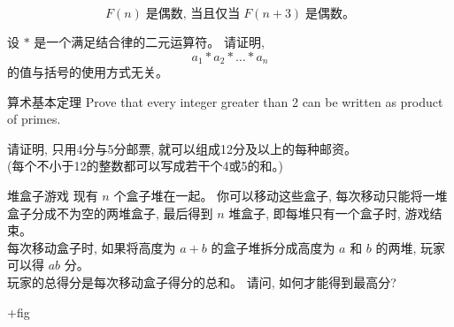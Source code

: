 
\begin{frame}{}
  \begin{exampleblock}{}
    \[
      F(n) \;\text{是偶数, 当且仅当}\; F(n+3) \;\text{是偶数。}
    \]
  \end{exampleblock}
\end{frame}

\begin{frame}{}
  \begin{exampleblock}{}
    \begin{center}
      设 $\ast$ 是一个满足结合律的二元运算符。 请证明,
      \[
        a_{1} \ast a_{2} \ast \dots \ast a_{n}
      \]
      的值与括号的使用方式无关。
    \end{center}
  \end{exampleblock}
\end{frame}

\begin{frame}{}
  \begin{exampleblock}{算术基本定理}
    Prove that every integer greater than 2 can be written as product of primes.
  \end{exampleblock}
\end{frame}

\begin{frame}{}
  \begin{exampleblock}{}
    请证明, 只用4分与5分邮票, 就可以组成12分及以上的每种邮资。 \\[8pt]

    (每个不小于12的整数都可以写成若干个4或5的和。)
  \end{exampleblock}
\end{frame}

\begin{frame}{}
  \begin{exampleblock}{堆盒子游戏}
    现有 $n$ 个盒子堆在一起。
    你可以移动这些盒子, 每次移动只能将一堆盒子分成不为空的两堆盒子,
    最后得到 $n$ 堆盒子, 即每堆只有一个盒子时, 游戏结束。 \\[8pt]
    每次移动盒子时, 如果将高度为 $a + b$ 的盒子堆拆分成高度为 $a$ 和 $b$ 的两堆,
    玩家可以得 $ab$ 分。 \\[8pt]
    玩家的总得分是每次移动盒子得分的总和。
    请问, 如何才能得到最高分?
  \end{exampleblock}

  +fig
\end{frame}

